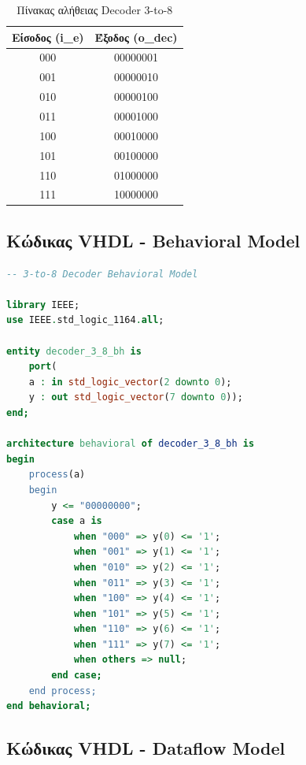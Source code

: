 \documentclass[12pt]{article}
\begin{document}
\begin{table}[H]
    \centering
    \begin{tabular}{|c|c|}
        \hline
        \textbf{Είσοδος (i\_e)} & \textbf{Έξοδος (o\_dec)} \\
        \hline
        000 & 00000001 \\
        \hline
        001 & 00000010 \\
        \hline
        010 & 00000100 \\
        \hline
        011 & 00001000 \\
        \hline
        100 & 00010000 \\
        \hline
        101 & 00100000 \\
        \hline
        110 & 01000000 \\
        \hline
        111 & 10000000 \\
        \hline
    \end{tabular}
    \caption{Πίνακας αλήθειας Decoder 3-to-8}
    \label{tab:decoder_truth}
\end{table}

\subsection*{Κώδικας VHDL - Behavioral Model}

\begin{lstlisting}[language=VHDL]
-- 3-to-8 Decoder Behavioral Model

library IEEE;
use IEEE.std_logic_1164.all;

entity decoder_3_8_bh is
    port(
    a : in std_logic_vector(2 downto 0);
    y : out std_logic_vector(7 downto 0));
end;

architecture behavioral of decoder_3_8_bh is
begin
    process(a)
    begin
        y <= "00000000";
        case a is
            when "000" => y(0) <= '1';
            when "001" => y(1) <= '1';
            when "010" => y(2) <= '1';
            when "011" => y(3) <= '1';
            when "100" => y(4) <= '1';
            when "101" => y(5) <= '1';
            when "110" => y(6) <= '1';
            when "111" => y(7) <= '1';
            when others => null;
        end case;
    end process;
end behavioral;
\end{lstlisting}

\subsection*{Κώδικας VHDL - Dataflow Model}
\end{document}
